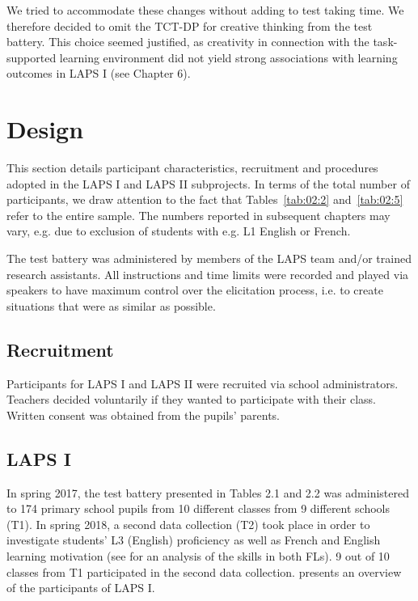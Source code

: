 \documentclass[output=paper]{langsci/langscibook}
\begin{document}
We tried to accommodate these changes without adding to test taking time. We therefore decided to omit the TCT-DP for creative thinking from the test battery. This choice seemed justified, as creativity in connection with the task-supported learning environment did not yield strong associations with learning outcomes in LAPS I (see Chapter 6). 

\section{Design}

This section details participant characteristics, recruitment and procedures adopted in the LAPS I and LAPS II subprojects. In terms of the total number of participants, we draw attention to the fact that Tables~\ref{tab:02:2} and~\ref{tab:02:5} refer to the entire sample. The numbers reported in subsequent chapters may vary, e.g. due to exclusion of students with e.g. L1 English or French. 

The test battery was administered by members of the LAPS team and/or trained research assistants. All instructions and time limits were recorded and played via speakers to have maximum control over the elicitation process, i.e. to create situations that were as similar as possible. 

 \subsection{Recruitment}


Participants for LAPS I and LAPS II were recruited via school administrators. Teachers decided voluntarily if they wanted to participate with their class. Written consent was obtained from the pupils’ parents. 

 \subsection{LAPS I}


In spring 2017, the test battery presented in Tables 2.1 and 2.2 was administered to 174 primary school pupils from 10 different classes from 9 different schools (T1). In spring 2018, a second data collection (T2) took place in order to investigate students’ L3 (English) proficiency as well as French and English learning motivation (see \citealt{BertheleUdry2019} for an analysis of the skills in both FLs). 9 out of 10 classes from T1 participated in the second data collection.  presents an overview of the participants of LAPS I.
\end{document}
